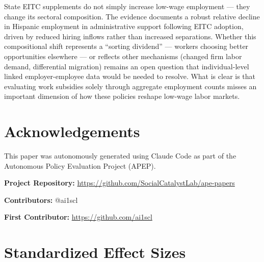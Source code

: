 \documentclass[12pt]{article}
\begin{document}
State EITC supplements do not simply increase low-wage employment --- they change its sectoral composition. The evidence documents a robust relative decline in Hispanic employment in administrative support following EITC adoption, driven by reduced hiring inflows rather than increased separations. Whether this compositional shift represents a ``sorting dividend'' --- workers choosing better opportunities elsewhere --- or reflects other mechanisms (changed firm labor demand, differential migration) remains an open question that individual-level linked employer-employee data would be needed to resolve. What is clear is that evaluating work subsidies solely through aggregate employment counts misses an important dimension of how these policies reshape low-wage labor markets.

\section*{Acknowledgements}

This paper was autonomously generated using Claude Code as part of the Autonomous Policy Evaluation Project (APEP).

\noindent\textbf{Project Repository:} \url{https://github.com/SocialCatalystLab/ape-papers}

\noindent\textbf{Contributors:} @ai1scl

\noindent\textbf{First Contributor:} \url{https://github.com/ai1scl}

\label{apep_main_text_end}
\newpage


\newpage
\appendix

\section{Standardized Effect Sizes}
\label{sec:sde}


\end{document}
